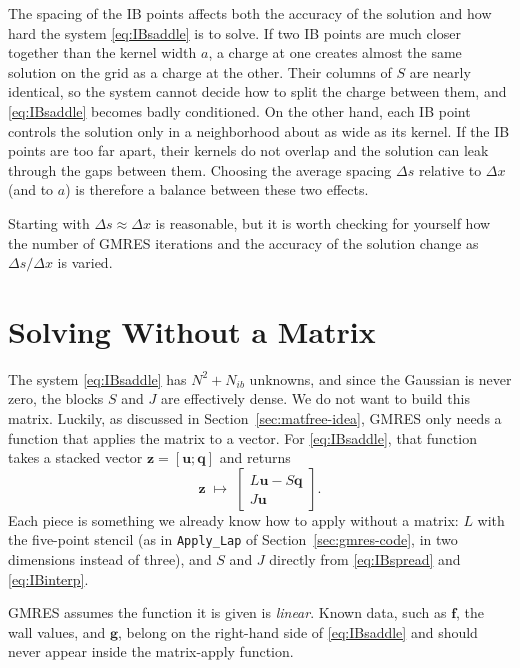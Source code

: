 The spacing of the IB points affects both the accuracy of the solution and
how hard the system \eqref{eq:IBsaddle} is to solve. If two IB points are
much closer together than the kernel width $a$, a charge at one creates
almost the same solution on the grid as a charge at the other. Their
columns of $S$ are nearly identical, so the system cannot decide how to
split the charge between them, and \eqref{eq:IBsaddle} becomes badly
conditioned. On the other hand, each IB point controls the solution only
in a neighborhood about as wide as its kernel. If the IB points are too far
apart, their kernels do not overlap and the solution can leak through the
gaps between them. Choosing the average spacing $\Delta s$ relative to
$\Delta x$ (and to $a$) is therefore a balance between these two effects.

\begin{remark}
Starting with $\Delta s \approx \Delta x$ is reasonable, but it is worth
checking for yourself how the number of GMRES iterations and the accuracy
of the solution change as $\Delta s/\Delta x$ is varied.
\end{remark}


\section{Solving Without a Matrix}
\label{sec:IBmatfree}

The system \eqref{eq:IBsaddle} has $N^2 + N_{ib}$ unknowns, and since the
Gaussian is never zero, the blocks $S$ and $J$ are effectively dense. We do
not want to build this matrix. Luckily, as discussed in
Section~\ref{sec:matfree-idea}, GMRES only needs a function that applies
the matrix to a vector. For \eqref{eq:IBsaddle}, that function takes a
stacked vector $\mathbf{z} = [\mathbf{u}; \mathbf{q}]$ and returns
\[
  \mathbf{z} \;\mapsto\;
  \begin{bmatrix}
    L\mathbf{u} - S\mathbf{q} \\ J\mathbf{u}
  \end{bmatrix}.
\]
Each piece is something we already know how to apply without a matrix:
$L$ with the five-point stencil (as in \texttt{Apply\_Lap} of
Section~\ref{sec:gmres-code}, in two dimensions instead of three), and $S$
and $J$ directly from \eqref{eq:IBspread} and \eqref{eq:IBinterp}.
\begin{remark}
GMRES assumes the function it is given is \emph{linear}. Known data, such
as $\mathbf{f}$, the wall values, and $\mathbf{g}$, belong on the
right-hand side of \eqref{eq:IBsaddle} and should never appear inside the
matrix-apply function. \end{remark}


